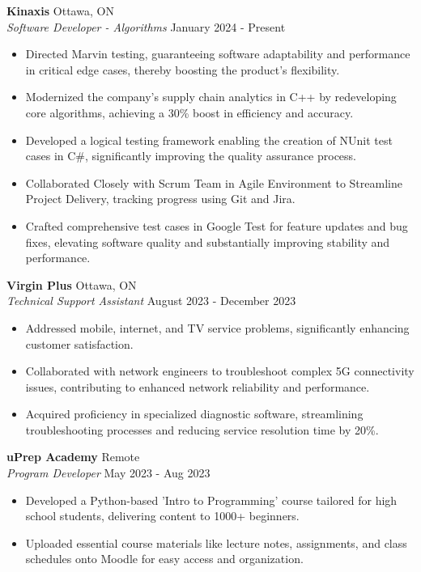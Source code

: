 \documentclass[a4paper]{article}
\begin{document}
\textbf{Kinaxis} \hfill Ottawa, ON\\
\textit{Software Developer - Algorithms} \hfill January 2024 - Present\\
\vspace{-1mm}
\begin{itemize} \itemsep 1pt

    \item Directed Marvin testing, guaranteeing software adaptability and performance in critical edge cases, thereby boosting the product's flexibility.
    \item Modernized the company's supply chain analytics in C++ by redeveloping core algorithms, achieving a 30\% boost in efficiency and accuracy.
    \item Developed a logical testing framework enabling the creation of NUnit test cases in C\#, significantly improving the quality assurance process. 
    \item Collaborated Closely with Scrum Team in Agile Environment to Streamline Project Delivery, tracking progress using Git and Jira.
    \item Crafted comprehensive test cases in Google Test for feature updates and bug fixes, elevating software quality and substantially improving stability and performance.
\end{itemize}
\textbf{Virgin Plus} \hfill Ottawa, ON\\
\textit{Technical Support Assistant} \hfill August 2023 - December 2023\\
\vspace{-1mm}
\begin{itemize} \itemsep 1pt
    \item Addressed mobile, internet, and TV service problems, significantly enhancing customer satisfaction.
    \item Collaborated with network engineers to troubleshoot complex 5G connectivity issues, contributing to enhanced network reliability and performance.
    \item 
Acquired proficiency in specialized diagnostic software, streamlining troubleshooting processes and reducing service resolution time by 20\%.
\end{itemize}
\textbf{uPrep Academy} \hfill Remote\\
\textit{Program Developer} \hfill May 2023 - Aug 2023\\
\vspace{-1mm}
\begin{itemize} \itemsep 1pt
    \item Developed a Python-based 'Intro to Programming' course tailored for high school students, delivering content to 1000+ beginners.
    \item Uploaded essential course materials like lecture notes, assignments, and class schedules onto Moodle for easy access and organization.
\end{itemize}
\end{document}
